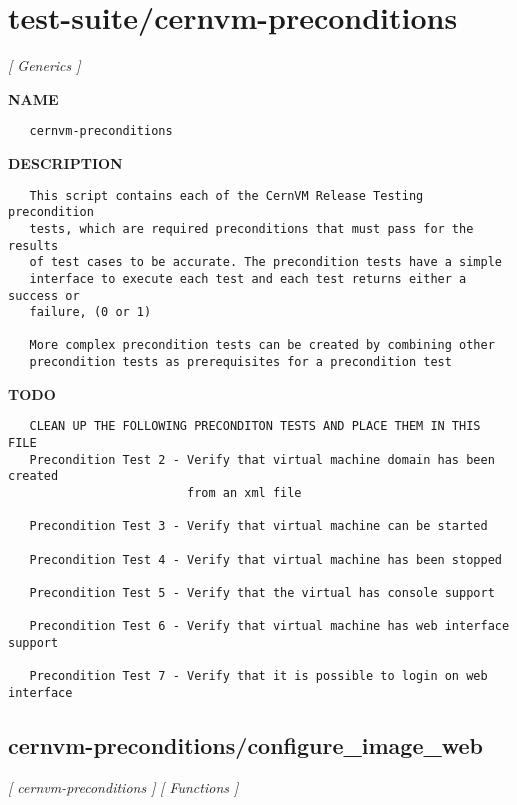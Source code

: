 \newpage
\section{test-suite/cernvm-preconditions}
\textsl{[ Generics ]}

\label{ch:robo40}
\label{ch:test_suite_cernvm_preconditions}
\textbf{NAME}
\begin{verbatim}
   cernvm-preconditions
\end{verbatim}
\textbf{DESCRIPTION}
\begin{verbatim}
   This script contains each of the CernVM Release Testing precondition
   tests, which are required preconditions that must pass for the results 
   of test cases to be accurate. The precondition tests have a simple
   interface to execute each test and each test returns either a success or 
   failure, (0 or 1)

   More complex precondition tests can be created by combining other 
   precondition tests as prerequisites for a precondition test
\end{verbatim}
\textbf{TODO}
\begin{verbatim}
   CLEAN UP THE FOLLOWING PRECONDITON TESTS AND PLACE THEM IN THIS FILE
   Precondition Test 2 - Verify that virtual machine domain has been created 
                         from an xml file

   Precondition Test 3 - Verify that virtual machine can be started

   Precondition Test 4 - Verify that virtual machine has been stopped

   Precondition Test 5 - Verify that the virtual has console support

   Precondition Test 6 - Verify that virtual machine has web interface support

   Precondition Test 7 - Verify that it is possible to login on web interface
\end{verbatim}
\newpage
\subsection{cernvm-preconditions/configure\_image\_web}
\textsl{[ cernvm-preconditions ]}
\textsl{[ Functions ]}

